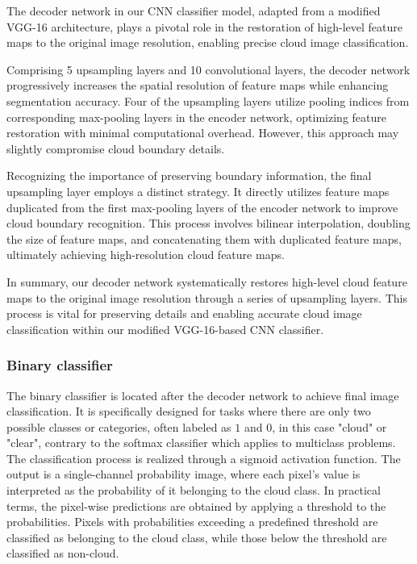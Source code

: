 \documentclass[amt, article]{copernicus}
\begin{document}
The decoder network in our CNN classifier model, adapted from a modified VGG-16 architecture, plays a pivotal role in the restoration of high-level feature maps to the original image resolution, enabling precise cloud image classification.

Comprising 5 upsampling layers and 10 convolutional layers, the decoder network progressively increases the spatial resolution of feature maps while enhancing segmentation accuracy. Four of the upsampling layers utilize pooling indices from corresponding max-pooling layers in the encoder network, optimizing feature restoration with minimal computational overhead. However, this approach may slightly compromise cloud boundary details.

Recognizing the importance of preserving boundary information, the final upsampling layer employs a distinct strategy. It directly utilizes feature maps duplicated from the first max-pooling layers of the encoder network to improve cloud boundary recognition. This process involves bilinear interpolation, doubling the size of feature maps, and concatenating them with duplicated feature maps, ultimately achieving high-resolution cloud feature maps.

In summary, our decoder network systematically restores high-level cloud feature maps to the original image resolution through a series of upsampling layers. This process is vital for preserving details and enabling accurate cloud image classification within our modified VGG-16-based CNN classifier.

\subsubsection{Binary classifier}

The binary classifier is located after the decoder network to achieve final image classification. It is specifically designed for tasks where there are only two possible classes or categories, often labeled as $1$ and $0$, in this case "cloud" or "clear", contrary to the softmax classifier which applies to multiclass problems. The classification process is realized through a sigmoid activation function. The output is a single-channel probability image, where each pixel's value is interpreted as the probability of it belonging to the cloud class. In practical terms, the pixel-wise predictions are obtained by applying a threshold to the probabilities. Pixels with probabilities exceeding a predefined threshold are classified as belonging to the cloud class, while those below the threshold are classified as non-cloud.
\end{document}
